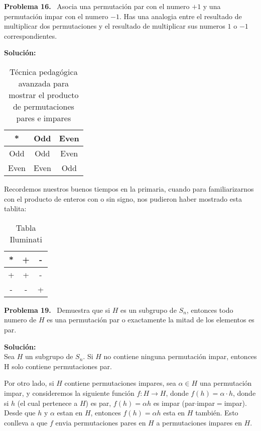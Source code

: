 \documentclass{article}
\newcounter{problem}
\newcounter{solution}
\newcommand\Problem[1]{%
  \stepcounter{problem}%
  \textbf{Problema #1.}~%
  \setcounter{solution}{0}%
}
\newcommand\TheSolution{%
  \textbf{Solución:}\\%
}
\begin{document}
\Problem{16} Asocia una permutación par con el numero $+1$ y una permutación
impar con el numero $-1$. Has una analogia entre el resultado de multiplicar
dos permutaciones y el resultado de multiplicar sus numeros $1$ o $-1$
correspondientes.

\TheSolution{}
\begin{table}[htbp]
\begin{center}
\begin{tabular}{c|cc}
* & Odd & Even \\ \hline
Odd & Odd  & Even\\
Even & Even & Odd \\
\end{tabular}
\caption{Técnica pedagógica avanzada para mostrar el producto de permutaciones
pares e impares}
\end{center}
\end{table}

Recordemos nuestros buenos tiempos en la primaria, cuando para familiarizarnos
con el producto de enteros con o sin signo, nos pudieron haber mostrado esta
tablita:

\begin{table}[htbp]
\begin{center}
\begin{tabular}{c|cc}
* & + & - \\ \hline
+ & +  & -\\
- & - & + \\
\end{tabular}
\caption{Tabla Iluminati}
\end{center}
\end{table}

\Problem{19} Demuestra que si $H$ es un subgrupo de $S_n$, entonces todo
numero de $H$ es una permutación par o exactamente la mitad de los elementos
es par.

\TheSolution{}
Sea $H$ un subgrupo de $S_n$. Si $H$ no contiene ninguna permutaci\'on impar,
entonces H solo contiene permutaciones par.

Por otro lado, si $H$ contiene permutaciones impares, sea $\alpha \in H$ una
permutación impar, y consideremos la siguiente función $f: H \rightarrow
H$, donde $f(h) = \alpha \cdot h$, donde si $h$ (el cual pertenece a $H$) es
par, $f(h) = \alpha h$ es impar (par$\cdot$impar$=$impar). Desde que $h$ y
$\alpha$ estan en $H$, entonces $f(h)=\alpha h$ esta en $H$ también. Esto
conlleva a que $f$ envia permutaciones pares en $H$ a permutaciones impares
en $H$.
\end{document}
